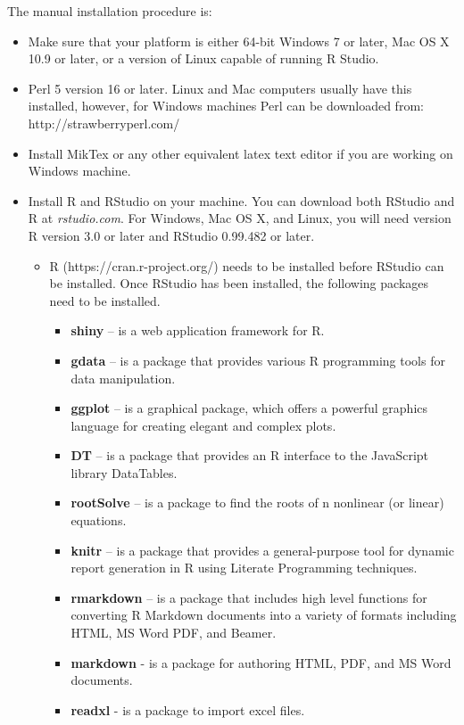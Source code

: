\documentclass[conference]{IEEEtran}
\begin{document}
The manual installation procedure is:
\begin{itemize}
  \item {Make sure that your platform is either 64-bit Windows 7 or later, Mac OS X 10.9 or later, or a version of Linux capable of running R Studio.}
  \item {Perl 5 version 16 or later. Linux and Mac computers usually have this installed, however, for Windows machines Perl can be downloaded from: http://strawberryperl.com/}
  \item{Install MikTex or any other equivalent latex text editor if you are working on Windows machine.}
  \item {Install R and RStudio on your machine. You can download both RStudio and R at \textit{rstudio.com}. For Windows, Mac OS X, and Linux, you will need version R version 3.0 or later and RStudio 0.99.482 or later.
      \begin{itemize}
        \item {R (https://cran.r-project.org/) needs to be installed before RStudio can be installed. Once RStudio has been installed, the following packages need to be installed.
        \begin{itemize}
          \item {\textbf{shiny} – is a web application framework for R.}
          \item {\textbf{gdata} – is a package that provides various R programming tools for data manipulation.}
          \item {\textbf{ggplot} – is a graphical package, which offers a powerful graphics language for creating elegant and complex plots.}
          \item {\textbf{DT} – is a package that provides an R interface to the JavaScript library DataTables.}
          \item {\textbf{rootSolve} – is a package to find the roots of n nonlinear (or linear) equations.}
          \item {\textbf{knitr} – is a package that provides a general-purpose tool for dynamic report generation in R using Literate Programming techniques.}
          \item {\textbf{rmarkdown} – is a package that includes high level functions for converting R Markdown documents into a variety of formats including HTML, MS Word PDF, and Beamer.}
          \item {\textbf{markdown} - is a package for authoring HTML, PDF, and MS Word documents.}
          \item {\textbf{readxl} - is a package to import excel files.}

\end{itemize}}
\end{itemize}}
\end{itemize}
\end{document}
